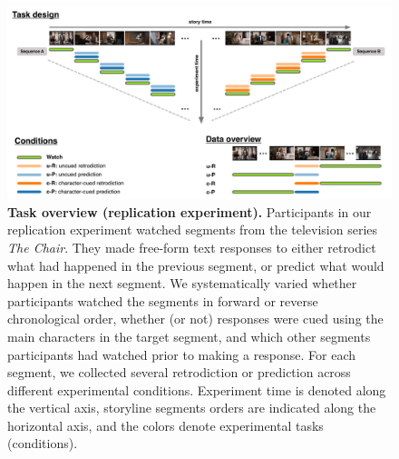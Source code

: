 \documentclass[10pt]{article}
\begin{document}
  \newpage


\begin{figure}[tp]
    \centering
    \includegraphics[width=\textwidth]{methods_rep}
      \caption{\textbf{Task overview (replication experiment).} Participants in our replication experiment watched segments from the television series \textit{The Chair}. They made free-form text responses to either retrodict what had happened in the previous segment, or predict what would happen in the next segment. We systematically varied whether participants watched the segments in forward or reverse chronological order, whether (or not) responses were cued using the main characters in the target segment, and which other segments participants had watched prior to making a response. For each segment, we collected several retrodiction or prediction across different experimental conditions. Experiment time is denoted along the vertical axis, storyline segments orders are indicated along the horizontal axis, and the colors denote experimental tasks (conditions).}
    \label{fig:methods_rep}
\end{figure}
\end{document}
